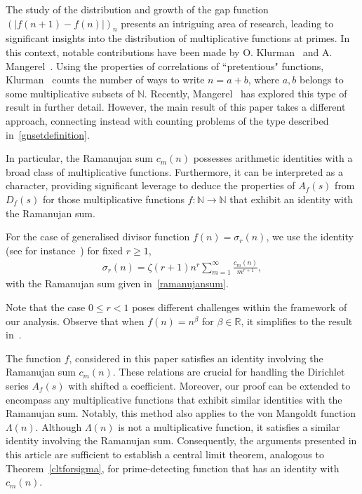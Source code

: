 \documentclass[12pt, oneside,reqno]{amsart}
\numberwithin{equation}{section}
\begin{document}
The study of the distribution and growth of the gap function $(|f(n+1)-f(n)|)_{n}$ presents an intriguing area of research, leading to significant insights into the distribution of multiplicative functions at primes. In this context, notable contributions have been made by O. Klurman~\cite{klurman} and A. Mangerel~\cite{sacha}. Using the properties of correlations of ``pretentious" functions, Klurman~\cite{klurman} counts the number of ways to write $n=a+b$, where $a,b$ belongs to some multiplicative subsets of $\mathbb{N}$. Recently, Mangerel~\cite{sacha} has explored this type of result in further detail. However, the main result of this paper takes a different approach, connecting instead with counting problems of the type described in~\eqref{gnsetdefinition}.

\medskip

In particular, the Ramanujan sum $c_m(n)$ possesses arithmetic identities with a broad class of multiplicative functions. Furthermore, it can be interpreted as a character, providing significant leverage to deduce the properties of $A_f(s)$ from $D_f(s)$ for those multiplicative functions $f:\mathbb{N}\to\mathbb{N}$ that exhibit an identity with the Ramanujan sum.

For the case of generalised divisor function $f(n)=\sigma_r(n)$, we use the identity (see for instance~\cite{kratzel}) for fixed $r\geq 1$,
\begin{align}\label{kthdivisoridentity}
\sigma_r(n)
=\zeta(r+1)n^r\sum_{m=1}^{\infty}\frac{c_m(n)}{m^{r+1}},
\end{align} 
with the Ramanujan sum given in~\eqref{ramanujansum}.

Note that the case $0\leq r<1$ poses different challenges within the framework of our analysis. Observe that when $f(n)=n^{\beta}$ for $\beta\in\mathbb{R}$, it simplifies to the result in~\cite[Theorem 2]{lipniketal}.

\medskip

The function $f$, considered in this paper satisfies an identity involving the Ramanujan sum $c_m(n)$.  These relations are crucial for handling the Dirichlet series $A_f(s)$ with shifted a coefficient. Moreover, our proof can be extended to encompass any multiplicative functions that exhibit similar identities with the Ramanujan sum. Notably, this method also applies to the von Mangoldt function $\Lambda(n)$. Although $\Lambda(n)$ is not a multiplicative function, it satisfies a similar identity involving the Ramanujan sum. Consequently, the arguments presented in this article are sufficient to establish a central limit theorem, analogous to Theorem~\ref{cltforsigma}, for prime-detecting function that has an identity with $c_m(n)$.
\end{document}
